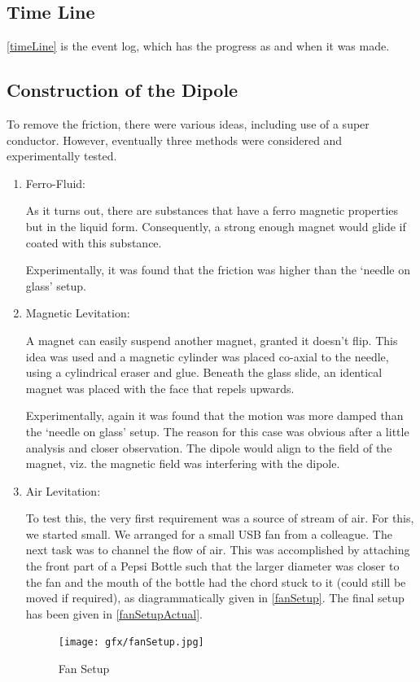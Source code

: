 	\subsection{Time Line}
		\autoref{timeLine} is the event log, which has the progress as and when it was made.		
	
	\subsection{Construction of the Dipole}
		To remove the friction, there were various ideas, including use of a super conductor. However, eventually three methods were considered and experimentally tested.
		\begin{enumerate}
			\item Ferro-Fluid: 
					\par
					As it turns out, there are substances that have a ferro magnetic properties but in the liquid form. Consequently, a strong enough magnet would glide if coated with this substance.
					\par
					Experimentally, it was found that the friction was higher than the `needle on glass' setup. 
			\item Magnetic Levitation:
					\par
					A magnet can easily suspend another magnet, granted it doesn't flip. This idea was used and a magnetic cylinder was placed co-axial to the needle, using a cylindrical eraser and glue. Beneath the glass slide, an identical magnet was placed with the face that repels upwards.
					\par
					Experimentally, again it was found that the motion was more damped than the `needle on glass' setup. The reason for this case was obvious after a little analysis and closer observation. The dipole would align to the field of the magnet, viz. the magnetic field was interfering with the dipole.
			\item Air Levitation:
					\par
					To test this, the very first requirement was a source of stream of air. For this, we started small. We arranged for a small USB fan from a colleague. The next task was to channel the flow of air. This was accomplished by attaching the front part of a Pepsi Bottle such that the larger diameter was closer to the fan and the mouth of the bottle had the chord stuck to it (could still be moved if required), as diagrammatically given in \autoref{fanSetup}. The final setup has been given in \autoref{fanSetupActual}.
					\begin{figure}[bth]
						\begin{center}
							\texttt{[image: gfx/fanSetup.jpg]}
						\end{center}
					\caption[Fan Setup]{Fan Setup}
					\label{fanSetup}
					\end{figure}


\end{enumerate}
